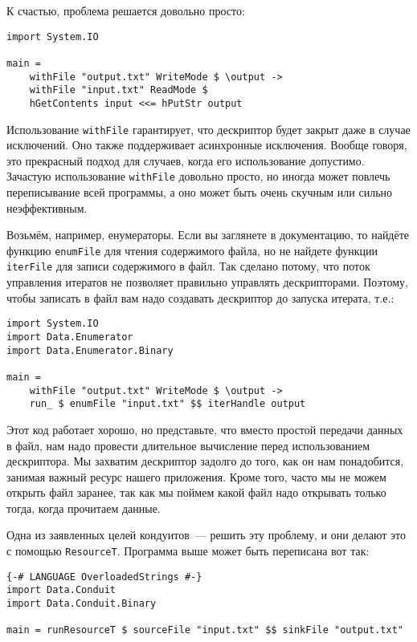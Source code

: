 К счастью, проблема решается довольно просто:
\begin{lstlisting}
import System.IO

main =
    withFile "output.txt" WriteMode $ \output ->
    withFile "input.txt" ReadMode $ 
    hGetContents input <<= hPutStr output
\end{lstlisting}

Использование \lstinline'withFile' гарантирует, что дескриптор будет закрыт даже в
случае
исключений. Оно также поддерживает асинхронные исключения. Вообще говоря, это прекрасный
подход для случаев, когда его использование допустимо. Зачастую использование \lstinline'withFile' довольно просто, но иногда может повлечь переписывание всей программы, а оно может быть очень скучным или сильно неэффективным.

Возьмём, например, енумераторы. Если вы заглянете в документацию, то найдёте функцию
\lstinline'enumFile' для чтения содержимого файла, но не найдете функции
\lstinline'iterFile' для записи
содержимого в файл. Так сделано потому, что поток управления итератов не позволяет
правильно управлять дескрипторами. Поэтому, чтобы записать в файл вам надо создавать
дескриптор до запуска итерата, т.е.: 

\begin{lstlisting}
import System.IO
import Data.Enumerator
import Data.Enumerator.Binary

main =
    withFile "output.txt" WriteMode $ \output ->
    run_ $ enumFile "input.txt" $$ iterHandle output
\end{lstlisting}

Этот код работает хорошо, но представьте, что вместо простой передачи данных в файл, нам
надо провести длительное вычисление перед использованием дескриптора. Мы захватим
дескриптор задолго до того, как он нам понадобится, занимая важный ресурс нашего
приложения. Кроме того, часто мы не можем открыть файл заранее, так как мы поймем какой файл
надо открывать только тогда, когда прочитаем данные.

Одна из заявленных целей кондуитов~--- решить эту проблему, и они делают это с помощью \lstinline'ResourceT'.
Программа выше может быть переписана вот так:
\begin{lstlisting}
{-# LANGUAGE OverloadedStrings #-}
import Data.Conduit
import Data.Conduit.Binary

main = runResourceT $ sourceFile "input.txt" $$ sinkFile "output.txt"
\end{lstlisting}

